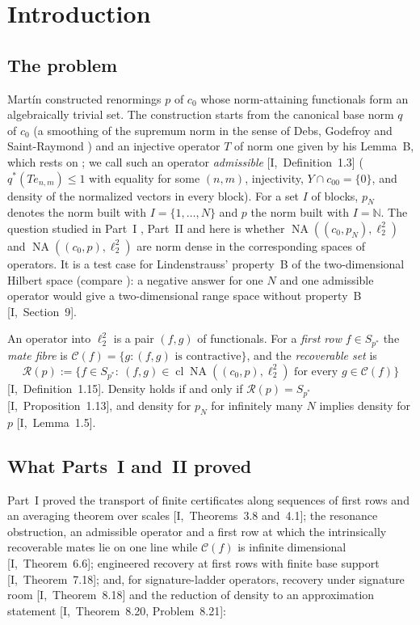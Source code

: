 \documentclass[10pt]{amsart}
\theoremstyle{definition}
\theoremstyle{remark}
\newcommand{\NA}{\operatorname{NA}}
\newcommand{\N}{\mathbb N}
\newcommand{\Cset}{\mathcal C}
\newcommand{\cl}{\operatorname{cl}}
\newcommand{\Rec}{\mathcal R}
\begin{document}
\section{Introduction}\label{sec:III-intro}

\subsection{The problem}
Mart\'in \cite{Martin} constructed renormings $p$ of $c_0$ whose
norm-attaining functionals form an algebraically trivial set.  The
construction starts from the canonical base norm $q$ of $c_0$ (a smoothing
of the supremum norm in the sense of Debs, Godefroy and Saint-Raymond
\cite{DGS}) and an injective operator $T$ of norm one given by his
Lemma~B, which rests on \cite[Proposition~2.8]{KLMW20}; we call such an
operator \emph{admissible} [I,~Definition~1.3] ($q^*(Te_{n,m})\le1$ with
equality for some $(n,m)$, injectivity, $Y\cap c_{00}=\{0\}$, and density
of the normalized vectors in every block).  For a set $I$ of blocks,
$p_N$ denotes the norm built with $I=\{1,\dots,N\}$ and $p$ the norm built
with $I=\N$.  The question studied in Part~I \cite{PartI}, Part~II
\cite{PartII} and here is whether $\NA((c_0,p_N),\ell_2^2)$ and
$\NA((c_0,p),\ell_2^2)$ are norm dense in the corresponding spaces of
operators.  It is a test case for Lindenstrauss' property~B
\cite{Lindenstrauss} of the two-dimensional Hilbert space (compare
\cite{JW,KLMW}): a negative answer for one $N$ and one admissible operator
would give a two-dimensional range space without property~B
[I,~Section~9].

An operator into $\ell_2^2$ is a pair $(f,g)$ of functionals.  For a
\emph{first row} $f\in S_{p^*}$ the \emph{mate fibre} is
$\Cset(f)=\{g:(f,g)\text{ is contractive}\}$, and the \emph{recoverable set}
is
\[
 \Rec(p):=\{f\in S_{p^*}:\ (f,g)\in\cl\NA((c_0,p),\ell_2^2)\text{ for every }
 g\in\Cset(f)\}
\]
[I,~Definition~1.15].  Density holds if and only if $\Rec(p)=S_{p^*}$
[I,~Proposition~1.13], and density for $p_N$ for infinitely many $N$
implies density for $p$ [I,~Lemma~1.5].

\subsection{What Parts~I and~II proved}
Part~I proved the transport of finite certificates along sequences of
first rows and an averaging theorem over scales [I,~Theorems~3.8
and~4.1]; the resonance obstruction, an admissible operator and a first
row at which the intrinsically recoverable mates lie on one line while
$\Cset(f)$ is infinite dimensional [I,~Theorem~6.6]; engineered recovery at
first rows with finite base support [I,~Theorem~7.18]; and, for
signature-ladder operators, recovery under signature room
[I,~Theorem~8.18] and the reduction of density to an approximation
statement [I,~Theorem~8.20, Problem~8.21]:
\end{document}
